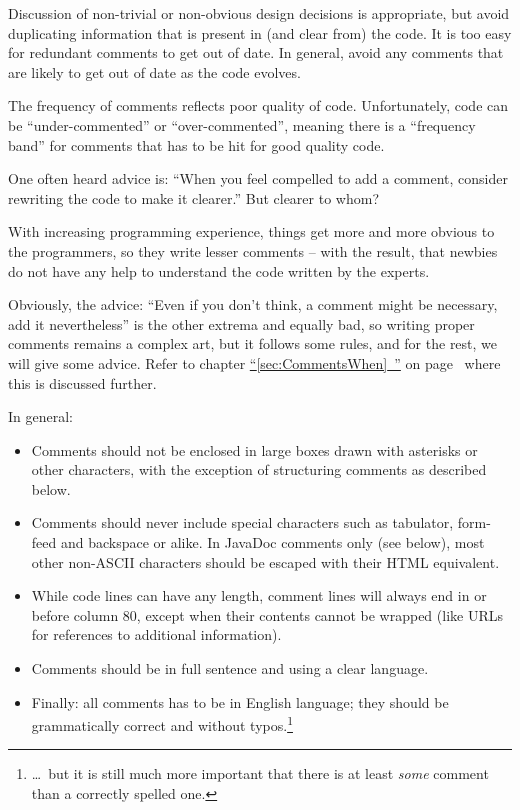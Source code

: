 \documentclass[11pt,a4paper, titlepage, parskip=half, headsepline, footsepline, cleardoublepage=current, headheight=1cm]{scrbook}
\newcommand*{\tqfullvref}[1]{\hyperref[{#1}]{“\ref*{#1}~\nameref*{#1}”} on page~\pageref{#1}}
\begin{document}
Discussion of non-trivial or non-obvious design decisions is appropriate, but avoid duplicating information that is present in (and clear from) the code. It is too easy for redundant comments to get out of date. In general, avoid any comments that are likely to get out of date as the code evolves.

The frequency of comments reflects poor quality of code. Unfortunately, code can be “under-commented” or “over-commented”, meaning there is a “frequency band” for comments that has to be hit for good quality code.

One often heard advice is: “When you feel compelled to add a comment, consider rewriting the code to make it clearer.” But clearer to whom?

With increasing programming experience, things get more and more obvious to the programmers, so they write lesser comments – with the result, that newbies do not have any help to understand the code written by the experts.

Obviously, the advice: “Even if you don't think, a comment might be necessary, add it nevertheless” is the other extrema and equally bad, so writing proper comments remains a complex art, but it follows some rules, and for the rest, we will give some advice. Refer to chapter \tqfullvref{sec:CommentsWhen} where this is discussed further.

In general:
\begin{itemize}
\item{Comments should not be enclosed in large boxes drawn with asterisks or other characters, with the exception of structuring comments as described below.}
\item{Comments should never include special characters such as tabulator, form-feed and backspace or alike. In JavaDoc comments only (see below), most other non-ASCII characters should be escaped with their HTML equivalent.}
\item{While code lines can have any length, comment lines will always end in or before column 80, except when their contents cannot be wrapped (like URLs for references to additional information).}
\item{Comments should be in full sentence and using a clear language.}
\item{Finally: all comments has to be in English language; they should be grammatically correct and without typos.\footnote{…~but it is still much more important that there is at least \textit{some} comment than a correctly spelled one.}}
\end{itemize}
\end{document}
